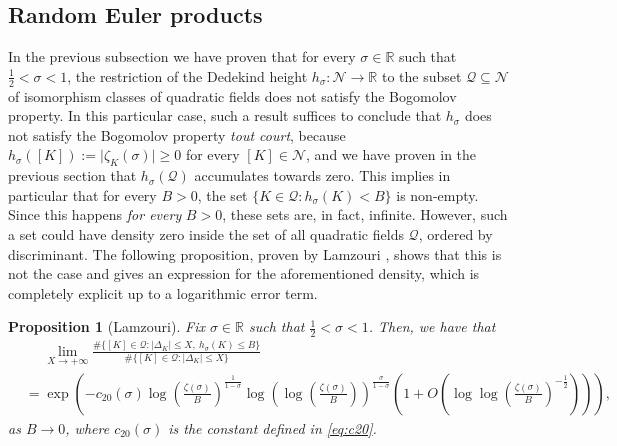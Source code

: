 \documentclass[10pt,a4paper]{amsart}
\theoremstyle{plain}
\newtheorem{proposition}[theorem]{Proposition}
\theoremstyle{definition}
\theoremstyle{remark}
\begin{document}
\subsection{Random Euler products}    

    In the previous subsection we have proven that for every $\sigma \in \mathbb{R}$ such that $\frac{1}{2} < \sigma < 1$, the restriction of the Dedekind height $h_\sigma \colon \mathcal{N} \to \mathbb{R}$ to the subset $\mathcal{Q} \subseteq \mathcal{N}$ of isomorphism classes of quadratic fields does not satisfy the Bogomolov property. In this particular case, such a result suffices to conclude that $h_\sigma$ does not satisfy the Bogomolov property \textit{tout court}, because $h_\sigma([K]) := \lvert \zeta_K(\sigma) \rvert \geq 0$ for every $[K] \in \mathcal{N}$, and we have proven in the previous section that  $h_\sigma(\mathcal{Q})$ accumulates towards zero. This implies in particular that for every $B > 0$, the set $\{ K \in \mathcal{Q} \colon h_\sigma(K) < B \}$ is non-empty. Since this happens \textit{for every} $B>0$, these sets are, in fact, infinite. However, such a set could have density zero inside the set of all quadratic fields $\mathcal{Q}$, ordered by discriminant. The following proposition, proven by Lamzouri \cite{Lamzouri_2011}, shows that this is not the case and gives an expression for the aforementioned density, which is completely explicit up to a logarithmic error term.
    \begin{proposition}[Lamzouri] \label{prop:Lamzouri}
        Fix $\sigma \in \mathbb{R}$ such that $\frac{1}{2}  < \sigma < 1$. Then, we have that
        \[
            \begin{aligned}
                &\phantom{=} \lim_{X \to +\infty} \frac{\# \{ [K] \in \mathcal{Q} \colon \lvert \Delta_K \rvert \leq X, \ h_\sigma(K) \leq B \}}{\# \{ [K] \in \mathcal{Q} \colon \lvert \Delta_K \rvert \leq X\}} \\ &= \exp\left( - c_{20}(\sigma) \log\left( \frac{\zeta(\sigma)}{B} \right)^{\frac{1}{1-\sigma}} \log\left(\log\left( \frac{\zeta(\sigma)}{B} \right)\right)^{\frac{\sigma}{1-\sigma}} \left( 1 + O\left( \log\log\left(\frac{\zeta(\sigma)}{B}\right)^{-\frac{1}{2}} \right) \right) \right),
            \end{aligned}
        \]
        as $B \to 0$, where $c_{20}(\sigma)$ is the constant defined in \eqref{eq:c20}. 
    \end{proposition}
\end{document}
